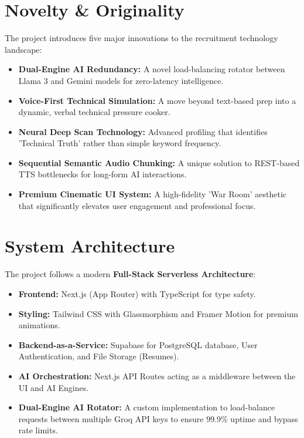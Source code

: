 \documentclass[12pt]{article}
\begin{document}
\section{Novelty \& Originality}
The project introduces five major innovations to the recruitment technology landscape:
\begin{itemize}
    \item \textbf{Dual-Engine AI Redundancy:} A novel load-balancing rotator between Llama 3 and Gemini models for zero-latency intelligence.
    \item \textbf{Voice-First Technical Simulation:} A move beyond text-based prep into a dynamic, verbal technical pressure cooker.
    \item \textbf{Neural Deep Scan Technology:} Advanced profiling that identifies 'Technical Truth' rather than simple keyword frequency.
    \item \textbf{Sequential Semantic Audio Chunking:} A unique solution to REST-based TTS bottlenecks for long-form AI interactions.
    \item \textbf{Premium Cinematic UI System:} A high-fidelity 'War Room' aesthetic that significantly elevates user engagement and professional focus.
\end{itemize}

\section{System Architecture}
The project follows a modern \textbf{Full-Stack Serverless Architecture}:
\begin{itemize}
    \item \textbf{Frontend:} Next.js (App Router) with TypeScript for type safety.
    \item \textbf{Styling:} Tailwind CSS with Glassmorphism and Framer Motion for premium animations.
    \item \textbf{Backend-as-a-Service:} Supabase for PostgreSQL database, User Authentication, and File Storage (Resumes).
    \item \textbf{AI Orchestration:} Next.js API Routes acting as a middleware between the UI and AI Engines.
    \item \textbf{Dual-Engine AI Rotator:} A custom implementation to load-balance requests between multiple Groq API keys to ensure 99.9\% uptime and bypass rate limits.
\end{itemize}
\end{document}
